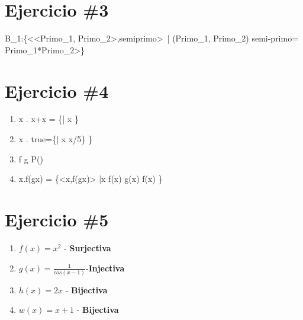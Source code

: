 \documentclass{article}
\begin{document}
\section{Ejercicio \#3}


\small{B_1:\{<<Primo_1, Primo_2>,semiprimo>\ | (Primo_1, Primo_2) \in{}\wedge semi-primo= Primo_1*Primo_2>\}} 


\section{Ejercicio \#4}

\begin{enumerate}

        \item{\lambda x \in {} . x+x = \{<x,x+x>| x \in {}}\} 
        
         \item{\lambda x \in {} . true=\{<x,true>| x \in {} \wedge x/5}\} \} 
         
         \item{f \circ g \in P()} 
         
         \item{\lambda x\in{}.f(gx) = \{<x,f(gx)> |x \in {}\wedge f(x)\in{} \wedge g(x) \subset f(x) }\} 
        
        

\end{enumerate}




\section{Ejercicio \#5}

\begin{enumerate}

        \item{$f(x)=x^2$} - \textbf{Surjectiva}
        \item{$g(x)=\frac{1}{cos(x-1)}$}-\textbf{Injectiva} 
        \item{$h(x)=2x$} - \textbf{Bijectiva}
        \item{$w(x)=x+1$} - \textbf{Bijectiva}

\end{enumerate}
\end{document}
